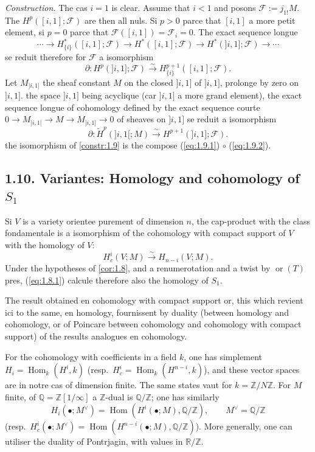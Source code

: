 \documentclass[11pt,a4paper]{article}
\theoremstyle{plain}
\theoremstyle{definition}
\DeclareMathOperator{\Hom}{Hom}
\newcommand{\ori}{\operatorname{or}}
\begin{document}
\noindent\textit{Construction.} The cas $i = 1$ is clear. Assume that $i < 1$ and posons $\mathcal{F} := j_{1!}M$. The $H^p([i,1];\mathcal{F})$ are then all nuls. Si $p > 0$ parce that $[i,1]$ a more petit element, si $p = 0$ parce that $\mathcal{F}([i,1]) = \mathcal{F}_i = 0$. The exact sequence longue
\[\cdots \to H^*_{\{i\}}([i,1];\mathcal{F}) \to H^*([i,1];\mathcal{F}) \to H^*(]i,1];\mathcal{F}) \to \cdots\]
se reduit therefore for $\mathcal{F}$ a isomorphism
\begin{equation}\label{eq:1.9.1}
\partial: H^p(]i,1];\mathcal{F}) \xrightarrow{\sim} H^{p+1}_{\{i\}}([i,1];\mathcal{F}).
\tag{1.9.1}
\end{equation}
Let $M_{]i,1]}$ the sheaf constant $M$ on the closed $]i,1]$ of $]i,1]$, prolonge by zero on $]i,1]$. the space $]i,1]$ being acyclique (car $]i,1]$ a more grand element), the exact sequence longue of cohomology defined by the exact sequence courte $0 \to M_{]i,1[} \to M \to M_{]i,1]} \to 0$ of sheaves on $]i,1]$ se reduit a isomorphism
\begin{equation}\label{eq:1.9.2}
\partial: \widetilde{H}^p(]i,1[;M) \xrightarrow{\sim} H^{p+1}(]i,1];\mathcal{F}).
\tag{1.9.2}
\end{equation}
the isomorphism of \ref{constr:1.9} is the compose (\ref{eq:1.9.1}) $\circ$ (\ref{eq:1.9.2}).

\subsection{1.10. Variantes: Homology and cohomology of $S_1$}\label{subsec:1.10}

Si $V$ is a variety orientee purement of dimension $n$, the cap-product with the class fondamentale is a isomorphism of the cohomology with compact support of $V$ with the homology of $V$:
\[H^i_c(V;M) \xrightarrow{\sim} H_{n-i}(V;M).\]
Under the hypotheses of \ref{cor:1.8}, and a renumerotation and a twist by $\ori(T)$ pres, (\ref{eq:1.8.1}) calcule therefore also the homology of $S_1$.

The result obtained en cohomology with compact support or, this which revient ici to the same, en homology, fournissent by duality (between homology and cohomology, or of Poincare between cohomology and cohomology with compact support) of the results analogues en cohomology.

For the cohomology with coefficients in a field $k$, one has simplement $H_i = \Hom_k(H^i,k)$ (resp.~$H^i_c = \Hom_k(H^{n-i},k)$), and these vector spaces are in notre cas of dimension finite. The same states vaut for $k = \mathbb{Z}/N\mathbb{Z}$. For $M$ finite, of $\mathbb{Q} = \mathbb{Z}[1/\infty]$ a $\mathbb{Z}$-dual is $\mathbb{Q}/\mathbb{Z}$; one has similarly
\[H_i(\bullet;M^\vee) = \Hom(H^i(\bullet;M),\mathbb{Q}/\mathbb{Z}), \qquad M^\vee = \mathbb{Q}/\mathbb{Z}\]
(resp.~$H^i_c(\bullet;M^\vee) = \Hom(H^{n-i}(\bullet;M),\mathbb{Q}/\mathbb{Z})$). More generally, one can utiliser the duality of Pontrjagin, with values in $\mathbb{R}/\mathbb{Z}$.
\end{document}
